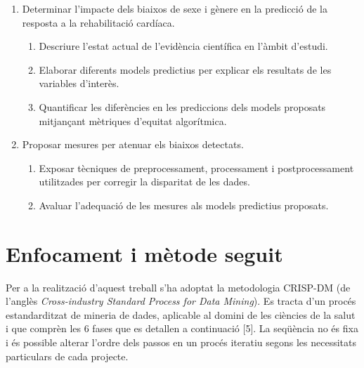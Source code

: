 \documentclass[CAT]{TFUOC}%
\begin{document}
\begin{enumerate}[label=\arabic*.]
\item Determinar l'impacte dels biaixos de sexe i gènere en la predicció de la resposta a la rehabilitació cardíaca.

  \begin{enumerate}[label*=\arabic*.]
  \item Descriure l'estat actual de l'evidència científica en l'àmbit d'estudi.
  \item Elaborar diferents models predictius per explicar els resultats de les variables d'interès.
  \item Quantificar les diferències en les prediccions dels models proposats mitjançant mètriques d'equitat algorítmica.
  \end{enumerate}
  
\item Proposar mesures per atenuar els biaixos detectats.

  \begin{enumerate}[label*=\arabic*.]
  \item Exposar tècniques de preprocessament, processament i postprocessament utilitzades per corregir la disparitat de les dades.
  \item Avaluar l'adequació de les mesures als models predictius proposats.
  \end{enumerate}

\end{enumerate}

\section{Enfocament i mètode seguit}\label{enfocament-i-muxe8tode-seguit}

Per a la realització d'aquest treball s'ha adoptat la metodologia CRISP-DM (de l'anglès \emph{Cross-industry Standard Process for Data Mining}). Es tracta d'un procés estandarditzat de mineria de dades, aplicable al domini de les ciències de la salut i que comprèn les 6 fases que es detallen a continuació {[}5{]}. La seqüència no és fixa i és possible alterar l'ordre dels passos en un procés iteratiu segons les necessitats particulars de cada projecte.
\end{document}
